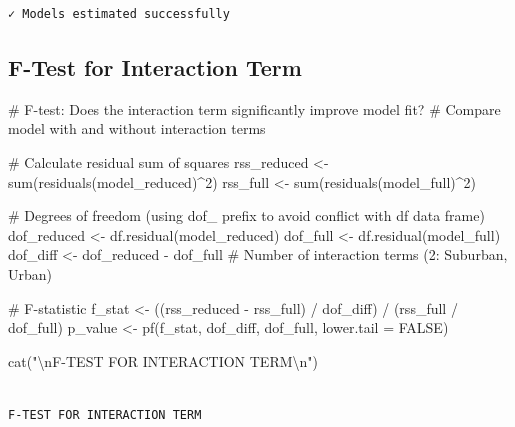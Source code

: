 \documentclass[
  11pt,
]{article}
\newenvironment{Shaded}{\begin{snugshade}}{\end{snugshade}}
\newcommand{\AttributeTok}[1]{\textcolor[rgb]{0.40,0.45,0.13}{#1}}
\newcommand{\CommentTok}[1]{\textcolor[rgb]{0.37,0.37,0.37}{#1}}
\newcommand{\ConstantTok}[1]{\textcolor[rgb]{0.56,0.35,0.01}{#1}}
\newcommand{\DecValTok}[1]{\textcolor[rgb]{0.68,0.00,0.00}{#1}}
\newcommand{\FunctionTok}[1]{\textcolor[rgb]{0.28,0.35,0.67}{#1}}
\newcommand{\NormalTok}[1]{\textcolor[rgb]{0.00,0.23,0.31}{#1}}
\newcommand{\OtherTok}[1]{\textcolor[rgb]{0.00,0.23,0.31}{#1}}
\newcommand{\SpecialCharTok}[1]{\textcolor[rgb]{0.37,0.37,0.37}{#1}}
\newcommand{\StringTok}[1]{\textcolor[rgb]{0.13,0.47,0.30}{#1}}
\begin{document}
\begin{verbatim}
✓ Models estimated successfully
\end{verbatim}

\subsection{F-Test for Interaction
Term}\label{f-test-for-interaction-term}

\begin{Shaded}
\begin{Highlighting}[]
\CommentTok{\# F{-}test: Does the interaction term significantly improve model fit?}
\CommentTok{\# Compare model with and without interaction terms}

\CommentTok{\# Calculate residual sum of squares}
\NormalTok{rss\_reduced }\OtherTok{\textless{}{-}} \FunctionTok{sum}\NormalTok{(}\FunctionTok{residuals}\NormalTok{(model\_reduced)}\SpecialCharTok{\^{}}\DecValTok{2}\NormalTok{)}
\NormalTok{rss\_full }\OtherTok{\textless{}{-}} \FunctionTok{sum}\NormalTok{(}\FunctionTok{residuals}\NormalTok{(model\_full)}\SpecialCharTok{\^{}}\DecValTok{2}\NormalTok{)}

\CommentTok{\# Degrees of freedom (using dof\_ prefix to avoid conflict with df data frame)}
\NormalTok{dof\_reduced }\OtherTok{\textless{}{-}} \FunctionTok{df.residual}\NormalTok{(model\_reduced)}
\NormalTok{dof\_full }\OtherTok{\textless{}{-}} \FunctionTok{df.residual}\NormalTok{(model\_full)}
\NormalTok{dof\_diff }\OtherTok{\textless{}{-}}\NormalTok{ dof\_reduced }\SpecialCharTok{{-}}\NormalTok{ dof\_full  }\CommentTok{\# Number of interaction terms (2: Suburban, Urban)}

\CommentTok{\# F{-}statistic}
\NormalTok{f\_stat }\OtherTok{\textless{}{-}}\NormalTok{ ((rss\_reduced }\SpecialCharTok{{-}}\NormalTok{ rss\_full) }\SpecialCharTok{/}\NormalTok{ dof\_diff) }\SpecialCharTok{/}\NormalTok{ (rss\_full }\SpecialCharTok{/}\NormalTok{ dof\_full)}
\NormalTok{p\_value }\OtherTok{\textless{}{-}} \FunctionTok{pf}\NormalTok{(f\_stat, dof\_diff, dof\_full, }\AttributeTok{lower.tail =} \ConstantTok{FALSE}\NormalTok{)}

\FunctionTok{cat}\NormalTok{(}\StringTok{"}\SpecialCharTok{\textbackslash{}n}\StringTok{F{-}TEST FOR INTERACTION TERM}\SpecialCharTok{\textbackslash{}n}\StringTok{"}\NormalTok{)}
\end{Highlighting}
\end{Shaded}

\begin{verbatim}

F-TEST FOR INTERACTION TERM
\end{verbatim}
\end{document}
